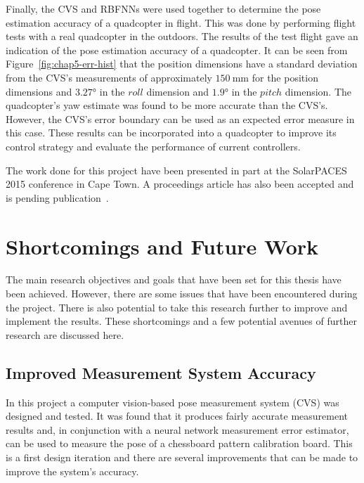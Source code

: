 Finally, the CVS and RBFNNs were used together to determine the pose estimation accuracy of a quadcopter in flight. This was done by performing flight tests with a real quadcopter in the outdoors. The results of the test flight gave an indication of the pose estimation accuracy of a quadcopter. It can be seen from Figure~\ref{fig:chap5-err-hist} that the position dimensions have a standard deviation from the CVS's measurements of approximately $\SI{150}{\mm}$ for the position dimensions and $\ang{3.27}$ in the $roll$ dimension and $\ang{1.9}$ in the $pitch$ dimension. The quadcopter's yaw estimate was found to be more accurate than the CVS's. However, the CVS's error boundary can be used as an expected error measure in this case. These results can be incorporated into a quadcopter to improve its control strategy and evaluate the performance of current controllers. 


The work done for this project have been presented in part at the SolarPACES 2015 conference in Cape Town. A proceedings article has also been accepted and is pending publication~\citep{lock2015}. 

\section{Shortcomings and Future Work}

The main research objectives and goals that have been set for this thesis have been achieved. However, there are some issues that have been encountered during the project. There is also potential to take this research further to improve and implement the results. These shortcomings and a few potential avenues of further research are discussed here. 

\subsection{Improved Measurement System Accuracy}

In this project a computer vision-based pose measurement system (CVS) was designed and tested. It was found that it produces fairly accurate measurement results and, in conjunction with a neural network measurement error estimator, can be used to measure the pose of a chessboard pattern calibration board. This is a first design iteration and there are several improvements that can be made to improve the system's accuracy. 

